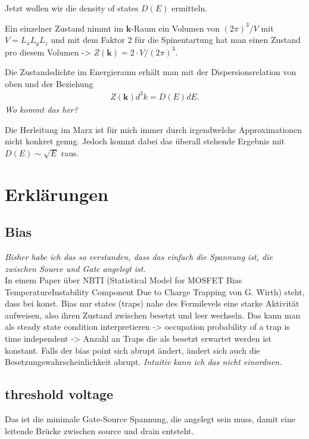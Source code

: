 \documentclass[paper=a4,10pt]{scrartcl}
\begin{document}
Jetzt wollen wir die density of states $D(E)$ ermitteln.

Ein einzelner Zustand nimmt im $\bm k$-Raum ein Volumen von $(2\pi)^3/V$ mit $V=L_xL_yL_z$ und mit dem Faktor 2 für die Spinentartung hat man einen Zustand pro diesem Volumen -> $Z(\bm k) = 2 \cdot V/(2\pi)^3$. 

Die Zustandsdichte im Energieraum erhält man mit der Dispersionsrelation von oben und der Beziehung
\begin{align}
Z(\bm k) d^3k = D(E)dE.
\end{align} 
\textit{Wo kommt das her?}

Die Herleitung im Marx ist für mich immer durch irgendwelche Approximationen nicht konkret genug. Jedoch kommt dabei das überall stehende Ergebnis mit $D(E) \sim \sqrt{E}$ raus.


\section{Erklärungen}
\subsection{Bias}
\textit{Bisher habe ich das so verstanden, dass das einfach die Spannung ist, die zwischen Source und Gate angelegt ist.} \\

\noindent
In einem Paper über NBTI (Statistical Model for MOSFET Bias TemperatureInstability Component Due to Charge Trapping von G. Wirth) steht, dass bei konst. Bias nur states (traps) nahe des Fermilevels eine starke Aktivität aufweisen, also ihren Zustand zwischen besetzt und leer wechseln. Das kann man als steady state condition interpretieren -> occupation probability of a trap is time independent -> Anzahl an Traps die als besetzt erwartet werden ist konstant. Falls der bias point sich abrupt ändert, ändert sich auch die Besetzungswahrscheinlichkeit abrupt.
\textit{Intuitiv kann ich das nicht einordnen.}

\subsection{threshold voltage}
Das ist die minimale Gate-Source Spannung, die angelegt sein muss, damit eine leitende Brücke zwischen source und drain entsteht.
\end{document}
